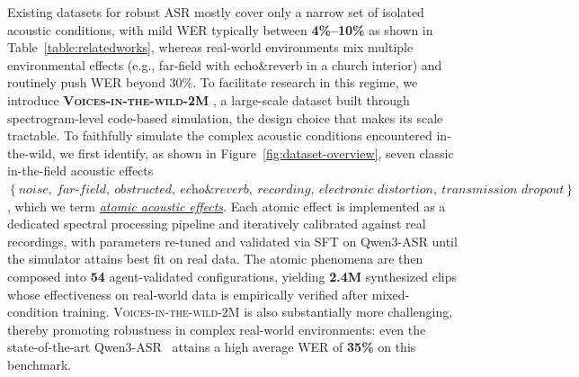 \documentclass{llmxive}
\begin{document}
Existing datasets for robust ASR mostly cover only a narrow set of isolated acoustic conditions, with mild WER typically between\textbf{ 4\%--10\%} as shown in Table~\ref{table:relatedworks}, whereas real-world environments mix multiple environmental effects (e.g., far-field with echo\&reverb in a church interior) and routinely push WER beyond 30\%. To facilitate research in this regime, we introduce \textbf{ \textsc{Voices-in-the-wild-2M} }, a large-scale dataset built through spectrogram-level code-based simulation, the design choice that makes its scale tractable. To faithfully simulate the complex acoustic conditions encountered in-the-wild, we first identify, as shown in Figure~\ref{fig:dataset-overview}, seven classic in-the-field acoustic effects $\left\{\textit{noise},\ \textit{far-field},\ \textit{obstructed},\ \textit{echo\&reverb},\ \textit{recording},\ \textit{electronic distortion},\ \textit{transmission dropout}\right\}$, which we term \underline{\textit{atomic acoustic effects}}. Each atomic effect is implemented as a dedicated spectral processing pipeline and iteratively calibrated against real recordings, with parameters re-tuned and validated via SFT on Qwen3-ASR until the simulator attains best fit on real data. The atomic phenomena are then composed into \textbf{54} agent-validated configurations, yielding \textbf{2.4M} synthesized clips whose effectiveness on real-world data is empirically verified after mixed-condition training.  \textsc{Voices-in-the-wild-2M}  is also substantially more challenging, thereby promoting robustness in complex real-world environments: even the state-of-the-art Qwen3-ASR~\citep{qwen3-asr} attains a high average WER of \textbf{35\%} on this benchmark.
\end{document}
